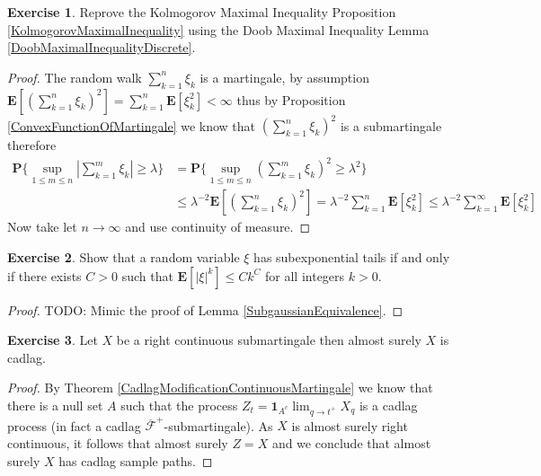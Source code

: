 \documentclass{amsbook}
\theoremstyle{definition}
\newtheorem{xca}{Exercise}
\theoremstyle{remark}
\newcommand{\expectation}[1]{\textbf{E}\left[#1\right]}
\newcommand{\probability}[1]{\textbf{P}\{#1\}}
\newcommand{\characteristic}[1]{\textbf{1}_{#1}}
\newcommand{\abs}[1]{\left \vert #1 \right \vert}
\begin{document}
\begin{xca}Reprove the Kolmogorov Maximal Inequality Proposition
  \ref {KolmogorovMaximalInequality} using the Doob Maximal Inequality Lemma \ref{DoobMaximalInequalityDiscrete}.
\end{xca}
\begin{proof}
The random walk $\sum_{k=1}^n \xi_k$ is a martingale, by assumption $\expectation{\left(\sum_{k=1}^n \xi_k \right )^2} = \sum_{k=1}^n \expectation{\xi_k^2} < \infty$ thus by Proposition \ref{ConvexFunctionOfMartingale} we know that $\left( \sum_{k=1}^n \xi_k \right)^2$ is a submartingale therefore
\begin{align*}
\probability{\sup_{1 \leq m \leq n} \abs{\sum_{k=1}^m \xi_k } \geq \lambda} &= \probability{\sup_{1 \leq m \leq n} \left(\sum_{k=1}^m \xi_k \right)^2 \geq \lambda^2} \\
&\leq \lambda^{-2} \expectation{\left(\sum_{k=1}^n \xi_k \right)^2} = \lambda^{-2} \sum_{k=1}^n \expectation{ \xi_k^2} 
\leq  \lambda^{-2} \sum_{k=1}^\infty \expectation{ \xi_k^2} 
\end{align*}
Now take let $n \to \infty$ and use continuity of measure.
\end{proof}

\begin{xca}Show that a random variable $\xi$ has subexponential tails
  if and only if there exists $C > 0$ such that
  $\expectation{\abs{\xi}^k} \leq C k^C$ for all integers $k > 0$.
\end{xca}
\begin{proof}
TODO: Mimic the proof of Lemma \ref{SubgaussianEquivalence}.
\end{proof}

\begin{xca}Let $X$ be a right continuous
  submartingale then almost surely $X$ is cadlag.
\end{xca}
\begin{proof}
By Theorem \ref{CadlagModificationContinuousMartingale} we know that
there is a null set $A$ such that
the process $Z_t = \characteristic{A^c} \lim_{q \to t^+}X_q$ is a
cadlag process (in fact a cadlag $\overline{\mathcal{F}}^+$-submartingale).
As $X$ is almost surely right continuous, it follows that almost surely $Z = X$ and we
conclude that almost surely $X$ has cadlag sample paths.
\end{proof}
\end{document}
